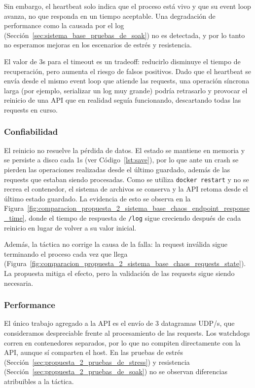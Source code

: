         Sin embargo, el heartbeat solo indica que el proceso está vivo y que su event loop avanza, no que responda en un tiempo
        aceptable. Una degradación de performance como la causada por el log (Sección~\ref{sec:sistema_base_pruebas_de_soak})
        no es detectada, y por lo tanto no esperamos mejoras en los escenarios de estrés y resistencia.

        El valor de 3s para el timeout es un tradeoff: reducirlo disminuye el tiempo de recuperación, pero aumenta
        el riesgo de falsos positivos. Dado que el heartbeat se envía desde el mismo event loop que atiende las requests, una
        operación síncrona larga (por ejemplo, serializar un log muy grande) podría retrasarlo y provocar el reinicio de una API
        que en realidad seguía funcionando, descartando todas las requests en curso.

        \subsubsection{Confiabilidad}
        \label{sec:propuesta_2_confiabilidad}

        El reinicio no resuelve la pérdida de datos. El estado se mantiene en memoria y se persiste a disco cada 1s
        (ver Código~\ref{lst:save}), por lo que ante un crash se pierden las operaciones realizadas desde el último guardado,
        además de las requests que estaban siendo procesadas. Como se utiliza \texttt{docker restart} y no se recrea el
        contenedor, el sistema de archivos se conserva y la API retoma desde el último estado guardado. La evidencia de esto
        se observa en la Figura~\ref{fig:comparacion_propuesta_2_sistema_base_chaos_endpoint_response_time}, donde el tiempo de
        respuesta de \texttt{/log} sigue creciendo después de cada reinicio en lugar de volver a su valor inicial.

        Además, la táctica no corrige la causa de la falla: la request inválida sigue terminando el proceso cada vez que llega (Figura~\ref{fig:comparacion_propuesta_2_sistema_base_chaos_requests_state}).
        La propuesta mitiga el efecto, pero la validación de las requests sigue siendo necesaria.

        \subsubsection{Performance}
        \label{sec:propuesta_2_performance}

        El único trabajo agregado a la API es el envío de 3 datagramas UDP/s, que consideramos despreciable frente
        al procesamiento de las requests. Los watchdogs corren en contenedores separados, por lo que no compiten directamente
        con la API, aunque sí comparten el host. En las pruebas de estrés (Sección~\ref{sec:propuesta_2_pruebas_de_stress}) y resistencia (Sección~\ref{sec:propuesta_2_pruebas_de_soak}) no se observan diferencias atribuibles
        a la táctica.

